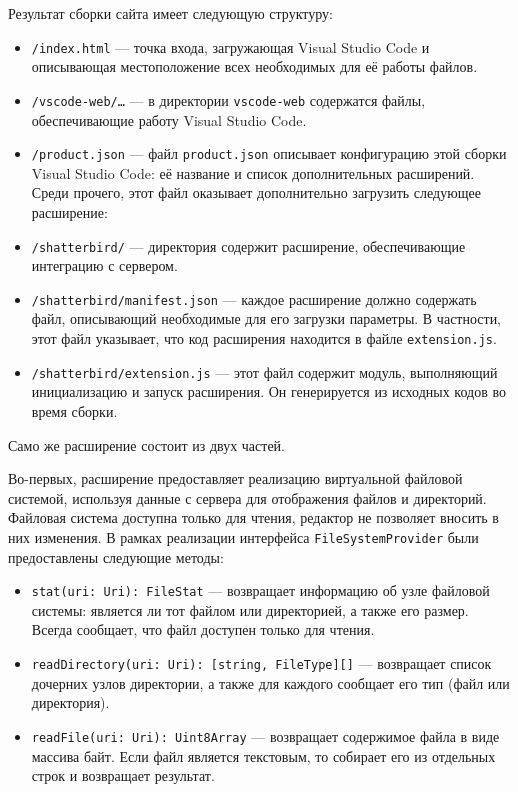 Результат сборки сайта имеет следующую структуру:
\begin{itemize}
    \item \texttt{/index.html} — точка входа, загружающая Visual Studio Code и описывающая местоположение всех необходимых для её работы файлов.
    \item \texttt{/vscode-web/…} — в директории \texttt{vscode-web} содержатся файлы, обеспечивающие работу Visual Studio Code.
    \item \texttt{/product.json} — файл \texttt{product.json} описывает конфигурацию этой сборки Visual Studio Code: её название и список дополнительных расширений. Среди прочего, этот файл оказывает дополнительно загрузить следующее расширение:
    \item \texttt{/shatterbird/} — директория содержит расширение, обеспечивающие интеграцию с сервером.
    \item \texttt{/shatterbird/manifest.json} — каждое расширение должно содержать файл, описывающий необходимые для его загрузки параметры. В частности, этот файл указывает, что код расширения находится в файле \texttt{extension.js}.
    \item \texttt{/shatterbird/extension.js} — этот файл содержит модуль, выполняющий инициализацию и запуск расширения. Он генерируется из исходных кодов во время сборки.
\end{itemize}

Само же расширение состоит из двух частей.

Во-первых, расширение предоставляет реализацию виртуальной файловой системой, используя данные с сервера для отображения файлов и директорий. Файловая система доступна только для чтения, редактор не позволяет вносить в них изменения. В рамках реализации интерфейса \texttt{FileSystemProvider} были предоставлены следующие методы:
\begin{itemize}
    \item \texttt{stat(uri: Uri): FileStat} — возвращает информацию об узле файловой системы: является ли тот файлом или директорией, а также его размер. Всегда сообщает, что файл доступен только для чтения.
    \item \texttt{readDirectory(uri: Uri): [string, FileType][]} — возвращает список дочерних узлов директории, а также для каждого сообщает его тип (файл или директория).
    \item \texttt{readFile(uri: Uri): Uint8Array} — возвращает содержимое файла в виде массива байт. Если файл является текстовым, то собирает его из отдельных строк и возвращает результат.
\end{itemize}

